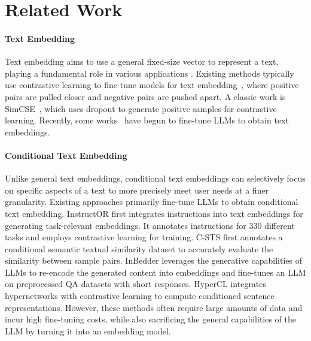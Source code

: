 \documentclass[11pt]{article}
\begin{document}
\section{Related Work}
\paragraph{Text Embedding}
Text embedding aims to use a general fixed-size vector to represent a text, playing a fundamental role in various applications \cite{DBLP:conf/aaai/YangCJYWGFG26}.
Existing methods typically use contrastive learning to fine-tune models for text embedding~\cite{gao2021simcse,DBLP:conf/emnlp/JiangJHZWZWHDZ22,DBLP:conf/acl/NiACMHCY22}, where positive pairs are pulled closer and negative pairs are pushed apart.
A classic work is SimCSE~\cite{gao2021simcse}, which uses dropout to generate positive samples for contrastive learning.
Recently, some works~\cite{li2024bellm,behnamghader2024llm2vec} have begun to fine-tune LLMs to obtain text embeddings.


\paragraph{Conditional Text Embedding}
Unlike general text embeddings, conditional text embeddings can selectively focus on specific aspects of a text to more precisely meet user needs at a finer granularity.
Existing approaches primarily fine-tune LLMs to obtain conditional text embedding.
InstructOR \cite{DBLP:conf/acl/SuSKWHOYSZ023} first integrates instructions into text embeddings for generating task-relevant embeddings.
It annotates instructions for 330 different tasks and employs contrastive learning for training.
C-STS \cite{csts} first annotates a conditional semantic textual similarity dataset to accurately evaluate the similarity between sample pairs.
InBedder \cite{InBedder} leverages the generative capabilities of LLMs to re-encode the generated content into embeddings and fine-tunes an LLM on preprocessed QA datasets with short responses.
HyperCL \cite{DBLP:conf/acl/YooCKK24} integrates hypernetworks with contrastive learning to compute conditioned sentence representations.
However, these methods often require large amounts of data and incur high fine-tuning costs, while also sacrificing the general capabilities of the LLM by turning it into an embedding model.
\end{document}
